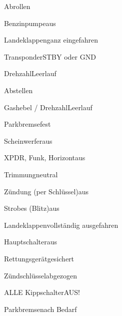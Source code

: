 \begin{checklist}{Abrollen}
	\item{Benzinpumpe}{aus}
	\item{Landeklappen}{ganz eingefahren}
	\item{Transponder}{STBY oder GND}
	\item{Drehzahl}{Leerlauf}
\end{checklist}

\begin{checklist}{Abstellen}
	  \item{Gashebel / Drehzahl}{Leerlauf}
	  \item{Parkbremse}{fest}
	  \item{Scheinwerfer}{aus}
	  \item{XPDR, Funk, Horizont}{aus}
	  \item{Trimmung}{neutral}
	  \item{Zündung (per Schlüssel)}{aus}
	  
	  \item{Strobes (Blitz)}{aus}
	  \item{Landeklappen}{vollständig ausgefahren}
	  \item{Hauptschalter}{aus}
	  \item{Rettungsgerät}{gesichert}
	  \item{Zündschlüssel}{abgezogen}
	  
	  \item{ALLE Kippschalter}{AUS!}
	  \item{Parkbremse}{nach Bedarf}
\end{checklist}


